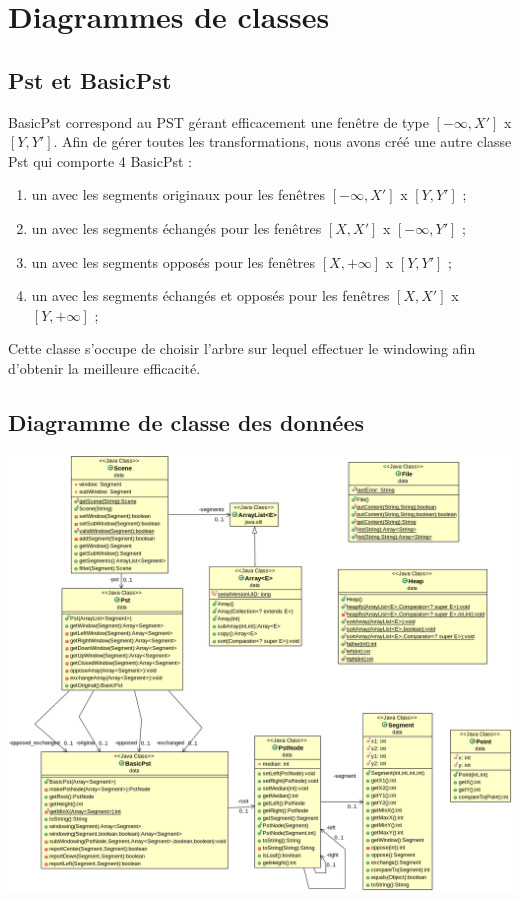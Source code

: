 \documentclass[10pt,a4paper]{article}
\begin{document}
\newpage
\section{Diagrammes de classes}
\subsection{Pst et BasicPst}
BasicPst correspond au PST gérant efficacement une fenêtre de type $[-\infty, X']$ x $[Y, Y']$. Afin de gérer toutes les transformations, nous avons créé une autre classe Pst qui comporte 4 BasicPst :
\begin{enumerate}
	\item un avec les segments originaux pour les fenêtres $[-\infty, X']$ x $[Y, Y']$ ;
	\item un avec les segments échangés pour les fenêtres $[X, X']$ x $[-\infty, Y']$ ;
	\item un avec les segments opposés pour les fenêtres $[X, +\infty]$ x $[Y, Y']$ ;
	\item un avec les segments échangés et opposés pour les fenêtres $[X, X']$ x $[Y, +\infty]$ ;
\end{enumerate}

Cette classe s'occupe de choisir l'arbre sur lequel effectuer le windowing afin d'obtenir la meilleure efficacité.

\subsection{Diagramme de classe des données}
\includegraphics[scale=0.3]{../src/UML/data.png}
\end{document}
